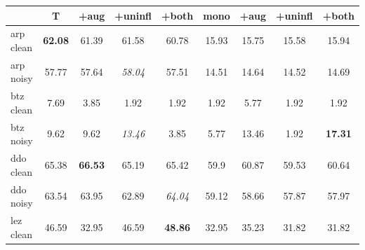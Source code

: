 \begin{table}[!tb]
    \centering
    \setlength{\tabcolsep}{8.pt}
    \begin{tabular}{l|cccc|cccc}
      \textbf{} & \textbf{T} & \textbf{+aug} & \textbf{+uninfl} & \textbf{+both} & \textbf{mono} &  \textbf{+aug} &
      \textbf{+uninfl} &
      \textbf{+both} \\ 
       \hline
      arp clean & \textbf{62.08} & 61.39 & 61.58          & 60.78 & 15.93 & 15.75 & 15.58 & 15.94 \\
      arp noisy & 57.77          & 57.64 & \textit{58.04} & 57.51 & 14.51 & 14.64 & 14.52 & 14.69 \\
      \hline
      btz clean & 7.69 & 3.85 & 1.92 & 1.92 & 1.92 & 5.77 & 1.92 & 1.92  \\
      btz noisy & 9.62 & 9.62 & \textit{13.46} & 3.85 & 5.77 & 13.46 & 1.92 & \textbf{17.31}  \\
      \hline
      ddo clean & 65.38 & \textbf{66.53} & 65.19 & 65.42          & 59.9 & 60.87 & 59.53 & 60.64  \\
      ddo noisy & 63.54 & 63.95          & 62.89 & \textit{64.04} & 59.12 & 58.66 & 57.87 & 57.97 \\
      \hline
      lez clean & 46.59          & 32.95 & 46.59 & \textbf{48.86} & 32.95 & 35.23 & 31.82 & 31.82 \\

\end{tabular}
\end{table}
